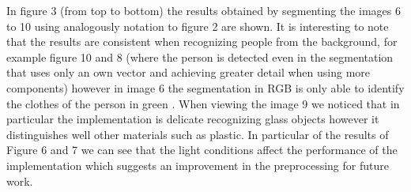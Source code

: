 \documentclass[conference]{IEEEtran}
\begin{document}
In figure 3 (from top to bottom) the results obtained by segmenting the images 6 to 10 using analogously notation to figure 2 are shown. It is interesting to note that the results are consistent when recognizing people from the background, for example figure 10 and 8 (where the person is detected even in the segmentation that uses only an own vector and achieving greater detail when using more components) however in image 6 the segmentation in RGB is only able to identify the clothes of the person in green . When viewing the image 9 we noticed that in particular the implementation is delicate recognizing glass objects however it distinguishes well other materials such as plastic. In particular of the results of Figure 6 and 7 we can see that the light conditions affect the performance of the implementation which suggests an improvement in the preprocessing for future work. \\
\end{document}
